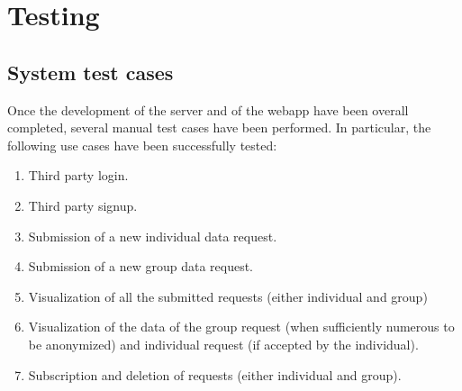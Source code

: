 \section{Testing}


\subsection{System test cases}
Once the development of the server and of the webapp have been overall completed, several manual test cases have been performed. In particular, the following use cases have been successfully tested:

\begin{enumerate}
\item Third party login.
\item Third party signup.
\item Submission of a new individual data request.
\item Submission of a new group data request.
\item Visualization of all the submitted requests (either individual and group)
\item Visualization of the data of the group request (when sufficiently numerous to be anonymized) and individual request (if accepted by the individual).
\item Subscription and deletion of requests (either individual and group).
\end{enumerate}


